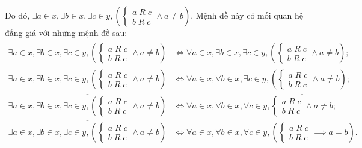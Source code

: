 Do đó, $\overline{\exists a \in x, \exists b \in x, \exists c \in y, \left(\begin{cases}
   a\;R\;c \\
   b\;R\;c
\end{cases} \land a \neq b \right)}$. Mệnh đề này có mối quan hệ đẳng giá với những mệnh đề sau:
\begin{align*}
   \overline{\exists a \in x, \exists b \in x, \exists c \in y, \left(\begin{cases}
      a\;R\;c \\
      b\;R\;c
   \end{cases} \land a \neq b \right)} &\iff \forall a \in x, \overline{\exists b \in x, \exists c \in y, \left(\begin{cases}
      a\;R\;c \\
      b\;R\;c
   \end{cases} \land a \neq b \right)}; \\
   \overline{\exists a \in x, \exists b \in x, \exists c \in y, \left(\begin{cases}
      a\;R\;c \\
      b\;R\;c
   \end{cases} \land a \neq b \right)} &\iff \forall a \in x, \forall b \in x, \overline{\exists c \in y, \left(\begin{cases}
      a\;R\;c \\
      b\;R\;c
   \end{cases} \land a \neq b \right)}; \\
   \overline{\exists a \in x, \exists b \in x, \exists c \in y, \left(\begin{cases}
      a\;R\;c \\
      b\;R\;c
   \end{cases} \land a \neq b \right)} &\iff \forall a \in x, \forall b \in x, \forall c \in y,\overline{\begin{cases}
      a\;R\;c \\
      b\;R\;c
   \end{cases} \land a \neq b}; \\
   \overline{\exists a \in x, \exists b \in x, \exists c \in y, \left(\begin{cases}
      a\;R\;c \\
      b\;R\;c
   \end{cases} \land a \neq b \right)} &\iff \forall a \in x, \forall b \in x, \forall c \in y,\left(\begin{cases}
      a\;R\;c \\
      b\;R\;c
   \end{cases} \implies a = b\right).
\end{align*}

